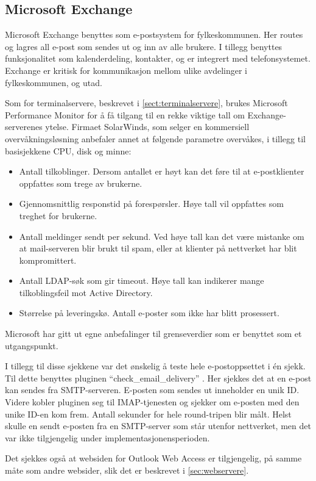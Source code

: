 \subsection{Microsoft Exchange}
Microsoft Exchange benyttes som e-postsystem for fylkeskommunen. Her routes og lagres all e-post som sendes ut og inn av alle brukere. I tillegg benyttes funksjonalitet som kalenderdeling, kontakter, og er integrert med telefonsystemet. Exchange er kritisk for kommunikasjon mellom ulike avdelinger i fylkeskommunen, og utad. 

Som for terminalservere, beskrevet i \ref{sect:terminalservere}, brukes Microsoft Performance Monitor for å få tilgang til en rekke viktige tall om Exchange-serverenes ytelse. Firmaet SolarWinds, som selger en kommersiell overvåkningsløsning anbefaler annet at følgende parametre overvåkes\cite{exchange}, i tillegg til basisjekkene CPU, disk og minne:
\begin{itemize}
	\item Antall tilkoblinger. Dersom antallet er høyt kan det føre til at e-postklienter oppfattes som trege av brukerne.
	\item Gjennomsnittlig responstid på forespørsler. Høye tall vil oppfattes som treghet for brukerne.
	\item Antall meldinger sendt per sekund. Ved høye tall kan det være mistanke om at mail-serveren blir brukt til spam, eller at klienter på nettverket har blit kompromittert.
	\item Antall LDAP-søk som gir timeout. Høye tall kan indikerer mange tilkoblingsfeil mot Active Directory.
	\item Størrelse på leveringskø. Antall e-poster som ikke har blitt prosessert.
\end{itemize}
Microsoft har gitt ut egne anbefalinger til grenseverdier som er benyttet som et utgangspunkt\cite{exchangethresholds}.

I tillegg til disse sjekkene var det ønskelig å teste hele e-postoppsettet i én sjekk. Til dette benyttes pluginen ``check\_email\_delivery'' \cite{exchange}. Her sjekkes det at en e-post kan sendes fra SMTP-serveren. E-posten som sendes ut inneholder en unik ID. Videre kobler pluginen seg til IMAP-tjenesten og sjekker om e-posten med den unike ID-en kom frem. Antall sekunder for hele round-tripen blir målt. Helst skulle en sendt e-posten fra en SMTP-server som står utenfor nettverket, men det var ikke tilgjengelig under implementasjonensperioden.

Det sjekkes også at websiden for Outlook Web Access er tilgjengelig, på samme måte som andre websider, slik det er beskrevet i \ref{sec:webservere}.

